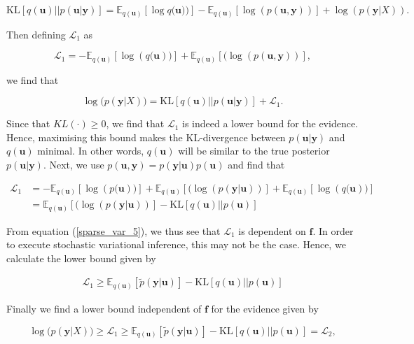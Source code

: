 \documentclass[12pt,a4paper,oneside]{book}
\begin{document}
\begin{equation}
\text{KL}[q(\bm{u})||p(\bm{u}|\bm{y})] = \mathbb{E}_{q(\bm{u})}[\log{q(\bm{u}}))] - \mathbb{E}_{q(\bm{u})}[\log(p(\bm{u},\bm{y}))] + \log(p(\bm{y}|X)).
\end{equation}

Then defining $\mathcal{L}_1$ as  

\begin{equation}
\mathcal{L}_1 =  -\mathbb{E}_{q(\bm{u})}[\log({q(\bm{u}}))] + \mathbb{E}_{q(\bm{u})}[(\log(p(\bm{u},\bm{y}))],
\end{equation}

we find that

\begin{equation}
\log{(p(\bm{y}|X)}) = \text{KL}[q(\bm{u})||p(\bm{u}|\bm{y})] + \mathcal{L}_1. 
\end{equation}

Since that $KL(\cdot) \geq 0$, we find that $\mathcal{L}_1$ is indeed a lower bound for the evidence. Hence, maximising this bound makes the KL-divergence between $p(\bm{u}|\bm{y})$ and $q(\bm{u})$ minimal. In other words, $q(\bm{u})$ will be similar to the true posterior $p(\bm{u}|\bm{y})$. Next, we use $p(\bm{u},\bm{y}) = p(\bm{\bm{y}|\bm{u}})p(\bm{u})$ and find that

\begin{align}
\mathcal{L}_1 &= -\mathbb{E}_{q(\bm{u})}[\log({p(\bm{u}}))] + \mathbb{E}_{q(\bm{u})}[(\log(p(\bm{y}|\bm{u}))]+ \mathbb{E}_{q(\bm{u})}[\log({q(\bm{u}}))] \nonumber \\
&= \mathbb{E}_{q(\bm{u})}[(\log(p(\bm{y}|\bm{u}))] - \text{KL}[q(\bm{u})||p(\bm{u})] 
\end{align}

From equation (\ref{sparse_var_5}), we thus see that $\mathcal{L}_1$ is dependent on $\bm{f}$. In order to execute stochastic variational inference, this may not be the case. Hence, we calculate the lower bound given by

\begin{align}
\mathcal{L}_1 \geq \mathbb{E}_{q(\bm{u})}[\tilde{p}(\bm{y}|\bm{u})] - \text{KL}[q(\bm{u})||p(\bm{u})]
\end{align}


Finally we find a lower bound independent of $\bm{f}$ for the evidence given by 

\begin{equation}\label{l2bound}
\log{(p(\bm{y}|X)}) \geq \mathcal{L}_1 \geq \mathbb{E}_{q(\bm{u})}[\tilde{p}(\bm{y}|\bm{u})] - \text{KL}[q(\bm{u})||p(\bm{u})] = \mathcal{L}_2,
\end{equation}
\end{document}
